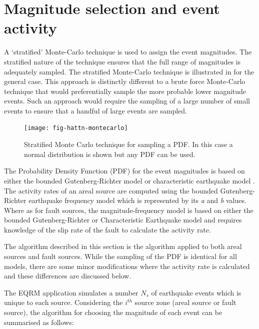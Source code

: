 \section{Magnitude selection and event activity}
\label{sec:magnitude_selection}

A `stratified' Monte-Carlo technique is used to assign the event
magnitudes. The stratified nature of the technique ensures that
the full range of magnitudes is adequately sampled. The stratified
Monte-Carlo technique is illustrated in
 for the general case. This approach is
distinctly different to a brute force Monte-Carlo technique that
would preferentially sample the more probable lower magnitude
events. Such an approach would require the sampling of a large
number of small events to ensure that a handful of large events
are sampled.


\begin{figure}[htp]
\texttt{[image: fig-hattn-montecarlo]}
\caption{Stratified Monte Carlo technique for sampling a PDF. In
this case a normal distribution is shown but any PDF can be used.}
\label{fig-hattn-montecarlo}
\end{figure}

The Probability Density Function (PDF) for the event magnitudes is
based on either the bounded Gutenberg-Richter model \citep{dr_Kramer96a} 
or characteristic earthquake model \citep{eqrm_Schwartz84}. The activity rates of an areal source are computed using the
bounded Gutenberg-Richter earthquake frequency model which is represented by its \emph{a} and \emph{b} values. Where as 
for fault sources, the magnitude-frequency model is based on either the bounded Gutenberg-Richter or Characteristic Earthquake model and 
requires knowledge of the slip rate of the fault to calculate the activity rate. 

The algorithm described in this section is the algorithm applied
to both areal sources and fault sources. While the sampling of the PDF is identical for all models, there are some minor modifications 
where the activity rate is calculated and these differences are discussed below. 

The EQRM application simulates a number $N_s$ of earthquake
events which is unique to each source. Considering the $i^{th}$ source zone (areal source or fault source), the algorithm for
choosing the magnitude of each event can be summarised as follows:

